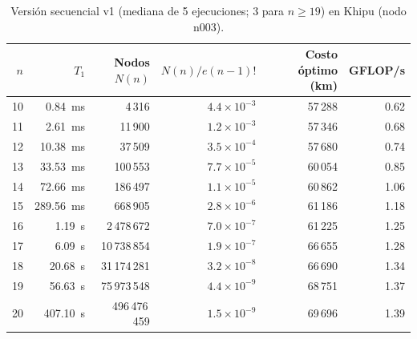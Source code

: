\begin{table}[H]
\centering
\caption{Versión secuencial v1 (mediana de 5 ejecuciones; 3 para $n \ge 19$) en Khipu (nodo n003).}
\label{tab:v1}
\small
\begin{tabular}{rrrrrr}
\toprule
$n$ & $T_1$ & Nodos $N(n)$ & $N(n)/e(n-1)!$ & Costo óptimo (km) & GFLOP/s \\
\midrule
10 & 0.84~ms & 4\,316 & $4.4\times10^{-3}$ & 57\,288 & 0.62 \\
11 & 2.61~ms & 11\,900 & $1.2\times10^{-3}$ & 57\,346 & 0.68 \\
12 & 10.38~ms & 37\,509 & $3.5\times10^{-4}$ & 57\,680 & 0.74 \\
13 & 33.53~ms & 100\,553 & $7.7\times10^{-5}$ & 60\,054 & 0.85 \\
14 & 72.66~ms & 186\,497 & $1.1\times10^{-5}$ & 60\,862 & 1.06 \\
15 & 289.56~ms & 668\,905 & $2.8\times10^{-6}$ & 61\,186 & 1.18 \\
16 & 1.19~s & 2\,478\,672 & $7.0\times10^{-7}$ & 61\,225 & 1.25 \\
17 & 6.09~s & 10\,738\,854 & $1.9\times10^{-7}$ & 66\,655 & 1.28 \\
18 & 20.68~s & 31\,174\,281 & $3.2\times10^{-8}$ & 66\,690 & 1.34 \\
19 & 56.63~s & 75\,973\,548 & $4.4\times10^{-9}$ & 68\,751 & 1.37 \\
20 & 407.10~s & 496\,476\,459 & $1.5\times10^{-9}$ & 69\,696 & 1.39 \\
\bottomrule
\end{tabular}
\end{table}

